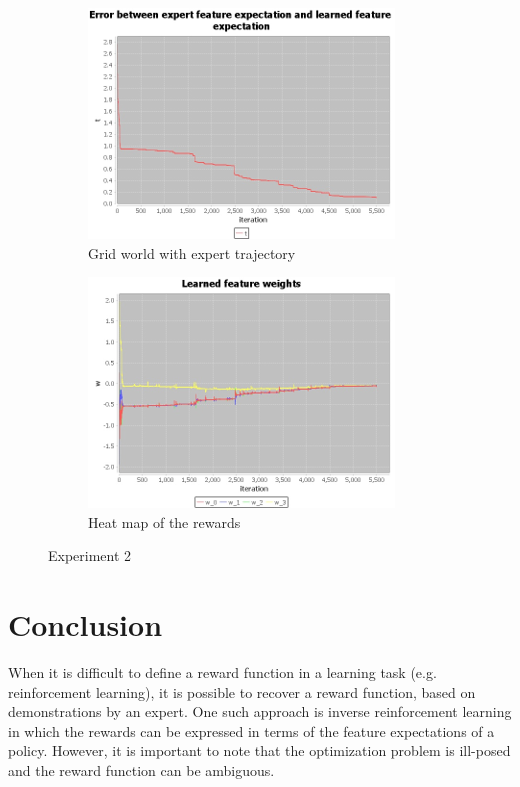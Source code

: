 \documentclass[10pt,a4paper,twocolumn]{article}
\begin{document}
\begin{figure}[h]
\begin{subfigure}[b]{0.5\textwidth}
	\includegraphics[width=\textwidth]{experiment_2_t}
	\caption{Grid world with expert trajectory}
	\label{fig:experiment2t}
\end{subfigure}
\begin{subfigure}[b]{0.5\textwidth}
	\includegraphics[width=\textwidth]{experiment_2_w}
	\caption{Heat map of the rewards}
	\label{fig:experiment2w}
\end{subfigure}
\caption{Experiment 2}
\end{figure}



\section{Conclusion}
When it is difficult to define a reward function in a learning task (e.g. reinforcement learning), it is possible to recover a reward function, based on demonstrations by an expert. One such approach is inverse reinforcement learning in which the rewards can be expressed in terms of the feature expectations of a policy. However, it is important to note that the optimization problem is ill-posed and the reward function can be ambiguous.

 

\end{document}
